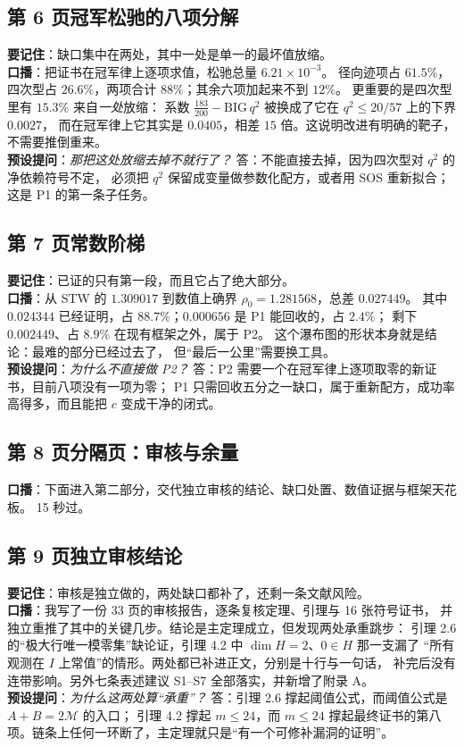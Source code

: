 \documentclass[UTF8,11pt]{ctexart}
\newcommand{\M}{\mathcal{M}}
\begin{document}
\subsection*{第 6 页\quad 冠军松驰的八项分解}
\textbf{要记住}：缺口集中在两处，其中一处是单一的最坏值放缩。\\
\textbf{口播}：把证书在冠军律上逐项求值，松驰总量 $6.21\times10^{-3}$。
径向迹项占 $61.5\%$，四次型占 $26.6\%$，两项合计 $88\%$；其余六项加起来不到 $12\%$。
更重要的是四次型里有 $15.3\%$ 来自\emph{一处}放缩：
系数 $\frac{183}{200}-\mathrm{BIG}\,q^2$ 被换成了它在 $q^2\le20/57$ 上的下界 $0.0027$，
而在冠军律上它其实是 $0.0405$，相差 $15$ 倍。这说明改进有明确的靶子，不需要推倒重来。\\
\textbf{预设提问}：\emph{那把这处放缩去掉不就行了？}
答：不能直接去掉，因为四次型对 $q^2$ 的净依赖符号不定，
必须把 $q^2$ 保留成变量做参数化配方，或者用 SOS 重新拟合；这是 P1 的第一条子任务。

\subsection*{第 7 页\quad 常数阶梯}
\textbf{要记住}：已证的只有第一段，而且它占了绝大部分。\\
\textbf{口播}：从 STW 的 $1.309017$ 到数值上确界 $\rho_0=1.281568$，总差 $0.027449$。
其中 $0.024344$ 已经证明，占 $88.7\%$；$0.000656$ 是 P1 能回收的，占 $2.4\%$；
剩下 $0.002449$、占 $8.9\%$ 在现有框架之外，属于 P2。
这个瀑布图的形状本身就是结论：最难的部分已经过去了，
但``最后一公里''需要换工具。\\
\textbf{预设提问}：\emph{为什么不直接做 P2？}
答：P2 需要一个在冠军律上逐项取零的新证书，目前八项没有一项为零；
P1 只需回收五分之一缺口，属于重新配方，成功率高得多，而且能把 $c$ 变成干净的闭式。

\subsection*{第 8 页\quad 分隔页：审核与余量}
\textbf{口播}：下面进入第二部分，交代独立审核的结论、缺口处置、数值证据与框架天花板。
15 秒过。

\subsection*{第 9 页\quad 独立审核结论}
\textbf{要记住}：审核是独立做的，两处缺口都补了，还剩一条文献风险。\\
\textbf{口播}：我写了一份 33 页的审核报告，逐条复核定理、引理与 16 张符号证书，
并独立重推了其中的关键几步。结论是主定理成立，但发现两处承重跳步：
引理 2.6 的``极大行唯一模零集''缺论证，引理 4.2 中 $\dim H=2$、$0\in H$ 那一支漏了
``所有观测在 $I$ 上常值''的情形。两处都已补进正文，分别是十行与一句话，
补完后没有连带影响。另外七条表述建议 S1--S7 全部落实，并新增了附录 A。\\
\textbf{预设提问}：\emph{为什么这两处算``承重''？}
答：引理 2.6 撑起阈值公式，而阈值公式是 $A+B=2\M$ 的入口；
引理 4.2 撑起 $m\le24$，而 $m\le24$ 撑起最终证书的第八项。链条上任何一环断了，主定理就只是``有一个可修补漏洞的证明''。
\end{document}
